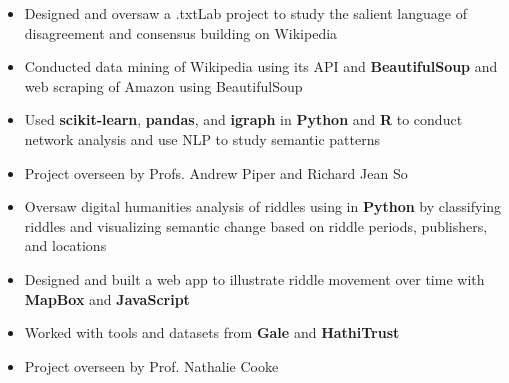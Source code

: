 \documentclass[10pt,ragged2e]{altacv}
\begin{document}
\tagline{}

\begin{fullwidth}
\makecvheader
\end{fullwidth}



\begin{itemize}
\item Designed and oversaw a .txtLab project to study the salient language of disagreement and consensus building on Wikipedia
\item Conducted data mining of Wikipedia using its API and \textbf{BeautifulSoup} and web scraping of Amazon using BeautifulSoup
\item Used \textbf{scikit-learn}, \textbf{pandas}, and \textbf{igraph} in \textbf{Python} and \textbf{R} to conduct network analysis and use NLP to study semantic patterns
\item Project overseen by Profs. Andrew Piper and Richard Jean So
\end{itemize}

\divider

\begin{itemize}
\item Oversaw digital humanities analysis of riddles using in \textbf{Python} by classifying riddles and visualizing semantic change based on riddle periods, publishers, and locations
\item Designed and built a web app to illustrate riddle movement over time with \textbf{MapBox} and \textbf{JavaScript}
\item Worked with tools and datasets from \textbf{Gale} and \textbf{HathiTrust}
\item Project overseen by Prof. Nathalie Cooke
\end{itemize}
\end{document}
